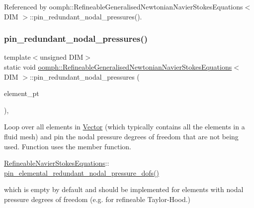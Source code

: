 Referenced by oomph\+::\+Refineable\+Generalised\+Newtonian\+Navier\+Stokes\+Equations$<$ D\+I\+M $>$\+::pin\+\_\+redundant\+\_\+nodal\+\_\+pressures().

\mbox{\label{classoomph_1_1RefineableGeneralisedNewtonianNavierStokesEquations_ae5a277a23c6df037288f5099b8253794}} 
\subsubsection{\texorpdfstring{pin\+\_\+redundant\+\_\+nodal\+\_\+pressures()}{pin\_redundant\_nodal\_pressures()}}
{\footnotesize\ttfamily template$<$unsigned D\+IM$>$ \\
static void \hyperlink{classoomph_1_1RefineableGeneralisedNewtonianNavierStokesEquations}{oomph\+::\+Refineable\+Generalised\+Newtonian\+Navier\+Stokes\+Equations}$<$ D\+IM $>$\+::pin\+\_\+redundant\+\_\+nodal\+\_\+pressures (\begin{DoxyParamCaption}\item[{const \hyperlink{classoomph_1_1Vector}{Vector}$<$ \hyperlink{classoomph_1_1GeneralisedElement}{Generalised\+Element} $\ast$$>$ \&}]{element\+\_\+pt }\end{DoxyParamCaption})\hspace{0.3cm}{\ttfamily [inline]}, {\ttfamily [static]}}



Loop over all elements in \hyperlink{classoomph_1_1Vector}{Vector} (which typically contains all the elements in a fluid mesh) and pin the nodal pressure degrees of freedom that are not being used. Function uses the member function. 


\begin{DoxyItemize}
\item {\ttfamily \hyperlink{classoomph_1_1RefineableNavierStokesEquations}{Refineable\+Navier\+Stokes\+Equations}\+:}\+: \hyperlink{classoomph_1_1RefineableGeneralisedNewtonianNavierStokesEquations_a9a4ca54f9b1f7d1b783b5ee0c561a236}{pin\+\_\+elemental\+\_\+redundant\+\_\+nodal\+\_\+pressure\+\_\+dofs()}
\end{DoxyItemize}which is empty by default and should be implemented for elements with nodal pressure degrees of freedom (e.\+g. for refineable Taylor-\/\+Hood.) 

